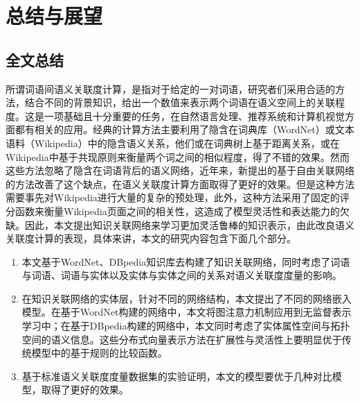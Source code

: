 \chapter{总结与展望}
\label{chap:chap07}

\section{全文总结}

所谓词语间语义关联度计算，是指对于给定的一对词语，研究者们采用合适的方法，结合不同的背景知识，给出一个数值来表示两个词语在语义空间上的关联程度。这是一项基础且十分重要的任务，在自然语言处理、推荐系统和计算机视觉方面都有相关的应用。经典的计算方法主要利用了隐含在词典库（WordNet）或文本语料（Wikipedia）中的隐含语义关系，他们或在词典树上基于距离关系，或在Wikipedia中基于共现原则来衡量两个词之间的相似程度，得了不错的效果。然而这些方法忽略了隐含在词语背后的语义网络，近年来，新提出的基于自由关联网络的方法改善了这个缺点，在语义关联度计算方面取得了更好的效果。但是这种方法需要事先对Wikipedia进行大量的复杂的预处理，此外，这种方法采用了固定的评分函数来衡量Wikipedia页面之间的相关性，这造成了模型灵活性和表达能力的欠缺。因此，本文提出知识关联网络来学习更加灵活鲁棒的知识表示，由此改良语义关联度计算的表现，具体来讲，本文的研究内容包含下面几个部分。
\begin{enumerate}
    \item 本文基于WordNet、DBpedia知识库去构建了知识关联网络，同时考虑了词语与词语、词语与实体以及实体与实体之间的关系对语义关联度度量的影响。
    \item 在知识关联网络的实体层，针对不同的网络结构，本文提出了不同的网络嵌入模型。在基于WordNet构建的网络中，本文将图注意力机制应用到无监督表示学习中；在基于DBpedia构建的网络中，本文同时考虑了实体属性空间与拓扑空间的语义信息。这些分布式向量表示方法在扩展性与灵活性上要明显优于传统模型中的基于规则的比较函数。
    \item 基于标准语义关联度度量数据集的实验证明，本文的模型要优于几种对比模型，取得了更好的效果。
\end{enumerate}

